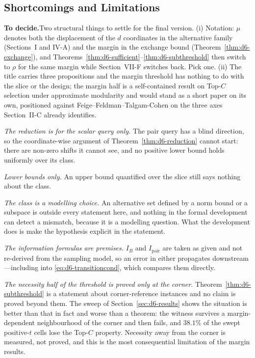\documentclass[conference]{IEEEtran}
\theoremstyle{definition}
\newif\ifshownotes\shownotestrue
\newcommand{\TODOPAR}[1]{\ifshownotes\par\vspace{2pt}\noindent%
  {\color{todocol}\textsf{\footnotesize\textbf{To decide.}\;#1}}\par\vspace{2pt}\fi}
\begin{document}
\subsection{Shortcomings and Limitations}
\TODOPAR{Two structural things to settle for the final version. (i) Notation:
$\mu$ denotes both the displacement of the $d$ coordinates in the alternative family
(Sections~I and IV-A) and the margin in the exchange bound (Theorem~\ref{thm:d6-exchange}),
and Theorems~\ref{thm:d6-sufficient}--\ref{thm:d6-subthreshold} then switch to $\rho$ for the same margin while
Section~VII-F switches back. Pick one. (ii) The title carries three propositions and the
margin threshold has nothing to do with the slice or the design; the margin half is a
self-contained result on Top-$C$ selection under approximate modularity and would stand as a
short paper on its own, positioned against Feige--Feldman--Talgam-Cohen on the three axes
Section~II-C already identifies.}

\emph{The reduction is for the scalar query only.} The pair query has a blind direction, so
the coordinate-wise argument of Theorem~\ref{thm:d6-reduction} cannot start: there are non-zero
shifts it cannot see, and no positive lower bound holds uniformly over its class.

\emph{Lower bounds only.} An upper bound quantified over the slice still says nothing about
the class.

\emph{The class is a modelling choice.} An alternative set defined by a norm bound or a
subspace is outside every statement here, and nothing in the formal development can detect a
mismatch, because it is a modelling question. What the development does is make the
hypothesis explicit in the statement.

\emph{The information formulas are premises.} $I_{B}$ and $I_{\mathrm{pair}}$ are taken as
given and not re-derived from the sampling model, so an error in either propagates
downstream---including into \eqref{eq:d6-transitioncond}, which compares them directly.

\emph{The necessity half of the threshold is proved only at the corner.}
Theorem~\ref{thm:d6-subthreshold} is a statement about corner-reference instances and no claim is
proved beyond them. The sweep of Section~\ref{sec:d6-results} shows the situation is better than
that in fact and worse than a theorem: the witness survives a margin-dependent neighbourhood of
the corner and then fails, and $38.1\%$ of the swept positive-$t$ cells lose the Top-$C$
property. Necessity away from the corner is measured, not proved, and this is the most
consequential limitation of the margin results.
\end{document}
